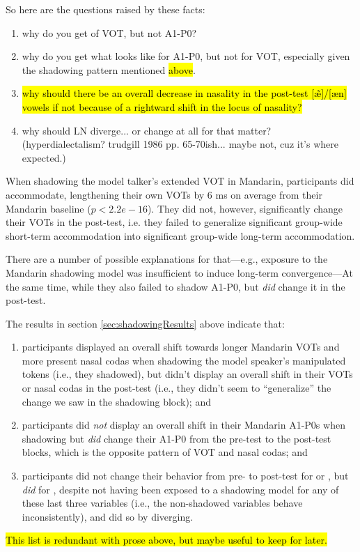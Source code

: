     So here are the questions raised by these facts:

    \begin{enumerate}
        \item why do you get \sta{} of VOT, but not A1-P0?
        \item why do you get what looks like \lta{} for A1-P0, but not for VOT, especially given the shadowing pattern mentioned \hl{above}.
        \item \hl{why should there be an overall decrease in nasality in the post-test [\~\ae]/[\ae n] vowels if not because of a rightward shift in the locus of nasality?}
        \item why should LN diverge... or change at all for that matter? (hyperdialectalism? trudgill 1986 pp. 65-70ish... maybe not, cuz it's where expected.)
    \end{enumerate}

    When shadowing the model talker's extended VOT in Mandarin, participants did accommodate, lengthening their own VOTs by 6 ms on average from their Mandarin baseline ($p < 2.2e-16$). They did not, however, significantly change their \ND{} VOTs in the post-test, i.e. they failed to generalize significant group-wide short-term accommodation into significant group-wide long-term accommodation.

    There are a number of possible explanations for that---e.g., exposure to the Mandarin shadowing model was insufficient to induce long-term convergence---At the same time, while they also failed to shadow A1-P0, but \emph{did} change it in the post-test.

    The results in section \ref{sec:shadowingResults} above indicate that:
    \begin{enumerate}
        \item participants displayed an overall shift towards longer Mandarin VOTs and more present nasal codas when shadowing the model speaker's manipulated tokens (i.e., they shadowed), but didn't display an overall shift in their \ND{} VOTs or nasal codas in the post-test (i.e., they didn't seem to ``generalize'' the change we saw in the shadowing block); and
        \item participants did \textit{not} display an overall shift in their Mandarin A1-P0s when shadowing but \textit{did} change their \ND{} A1-P0 from the pre-test to the post-test blocks, which is the opposite pattern of VOT and nasal codas; and
        \item participants did not change their behavior from pre- to post-test for \textipa{[e]/[iE]} or \textipa{[I]/[y]}, but \textit{did} for \textipa{[l]/[n]}, despite not having been exposed to a shadowing model for any of these last three variables (i.e., the non-shadowed variables behave inconsistently), and did so by diverging.
    \end{enumerate}
    \hl{This list is redundant with prose above, but maybe useful to keep for later.}


